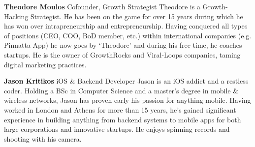 \bigskip
\noindent
\textbf{Theodore Moulos}\newline
\medskip Cofounder, Growth Strategist
\newline
Theodore is a Growth-Hacking Strategist. He has been on the game for over 15 years during which he has won over intrapreneurship and entrepreneurship. Having conquered all types of positions (CEO, COO, BoD member, etc.) within international companies (e.g. Pinnatta App) he now goes by ‘Theodore’ and during his free time, he coaches startups. He is the owner of GrowthRocks and Viral-Loops companies, taming digital marketing practices.
\par
\bigskip
\noindent
\textbf{Jason Kritikos}\newline
\medskip iOS \& Backend Developer
\newline
Jason is an iOS addict and a restless coder. Holding a BSc in Computer Science and a master’s degree in mobile \& wireless networks, Jason has proven early his passion for anything mobile. Having worked in London and Athens for more than 15 years, he’s gained significant experience in building anything from backend systems to mobile apps for both large corporations and innovative startups. He enjoys spinning records and shooting with his camera.
\par

